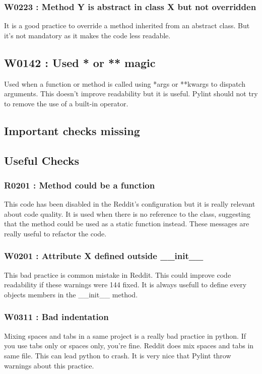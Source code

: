 \documentclass[11pt, a4paper]{article}
\newcommand{\pyl}{\textsf{Pylint}}
\begin{document}
\subsubsection*{W0223 : Method Y is abstract in class X but not overridden}

It is a good practice to override a method inherited from an abstract class. 
But it's not mandatory as it makes the code less readable.

\subsection*{W0142 : Used * or ** magic}

Used when a function or method is called using *args or **kwargs to dispatch arguments. 
This doesn't improve readability but it is useful.
\pyl{} should not try to remove the use of a built-in operator.

\subsection*{Important checks missing}

\subsection*{Useful Checks}

\subsubsection*{R0201 : Method could be a function}

This code has been disabled in the Reddit's configuration but it is really relevant about code quality. 
It is used when there is no reference to the class, suggesting that the method could be used as a static function instead.
These messages are really useful to refactor the code.

\subsubsection*{W0201 : Attribute X defined outside \_\_init\_\_}

This bad practice is common mistake in Reddit.
This could improve code readability if these warnings were 144 fixed.
It is always usefull to define every objects members in the \_\_init\_\_ method.

\subsubsection*{W0311 : Bad indentation}

Mixing spaces and tabs in a same project is a really bad practice in python.
If you use tabs only or spaces only, you're fine.
Reddit does mix spaces and tabs in same file. 
This can lead python to crash.
It is very nice that \pyl{} throw warnings about this practice.
\end{document}
